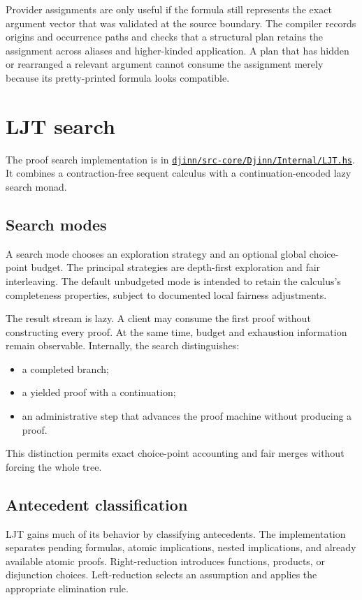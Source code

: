 \documentclass[10pt,letterpaper,oneside]{report}
\def\DjexBase{https://github.com/VladimirReshetnikov/Djex/blob/e454757d53ec057238c22fc6cd0d935b7d96b3dc/}
\newcommand{\dpath}[1]{\href{\DjexBase#1}{\nolinkurl{#1}}}
\begin{document}
Provider assignments are only useful if the formula still represents the exact argument vector that was validated at the source boundary. The compiler records origins and occurrence paths and checks that a structural plan retains the assignment across aliases and higher-kinded application. A plan that has hidden or rearranged a relevant argument cannot consume the assignment merely because its pretty-printed formula looks compatible.

\section{LJT search}\label{sec:ljt-search}

The proof search implementation is in \dpath{djinn/src-core/Djinn/Internal/LJT.hs}. It combines a contraction-free sequent calculus with a continuation-encoded lazy search monad.

\subsection{Search modes}

A search mode chooses an exploration strategy and an optional global choice-point budget. The principal strategies are depth-first exploration and fair interleaving. The default unbudgeted mode is intended to retain the calculus's completeness properties, subject to documented local fairness adjustments.

The result stream is lazy. A client may consume the first proof without constructing every proof. At the same time, budget and exhaustion information remain observable. Internally, the search distinguishes:

\begin{itemize}
  \item a completed branch;
  \item a yielded proof with a continuation;
  \item an administrative step that advances the proof machine without producing a proof.
\end{itemize}

This distinction permits exact choice-point accounting and fair merges without forcing the whole tree.

\subsection{Antecedent classification}

LJT gains much of its behavior by classifying antecedents. The implementation separates pending formulas, atomic implications, nested implications, and already available atomic proofs. Right-reduction introduces functions, products, or disjunction choices. Left-reduction selects an assumption and applies the appropriate elimination rule.
\end{document}
